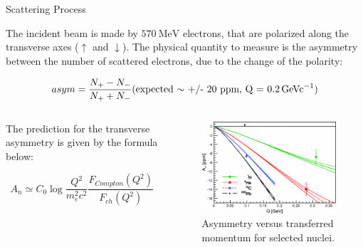 \documentclass[9pt,a4paper]{beamer}
\begin{document}
\begin{frame}{Scattering Process}

The incident beam is made by $\SI{570}{\mega \electronvolt}$ electrons, that are polarized along the transverse axes ($\uparrow$ and $\downarrow$). The physical quantity to measure is the asymmetry between the number of scattered electrons, due to the change of the polarity:

\begin{equation}
asym = \frac{N_{+} - N_{-}}{N_{+} + N_{-}} \text{(expected $\sim$ +/- 20 ppm, Q = \SI{0.2}{\giga\electronvolt c^{-1}})}
\end{equation}

\begin{columns}[T]
\begin{column}{.5\textwidth}

The prediction for the transverse asymmetry is given by the formula below:

\begin{equation}
A_{n} \simeq C_{0} \log \frac{Q^{2}}{m^2_e c^2} \frac{F_{Compton} (Q^2)}{F_{ch}(Q^2)}
\end{equation}


\end{column}
\begin{column}{.5\textwidth}
\centering
\begin{figure}
\includegraphics[width = \textwidth]{figures/PREXMeasure.png}
\caption{Asymmetry versus transferred momentum for selected nuclei.}
\end{figure}
\end{column}
\end{columns}

\end{frame}
\end{document}
